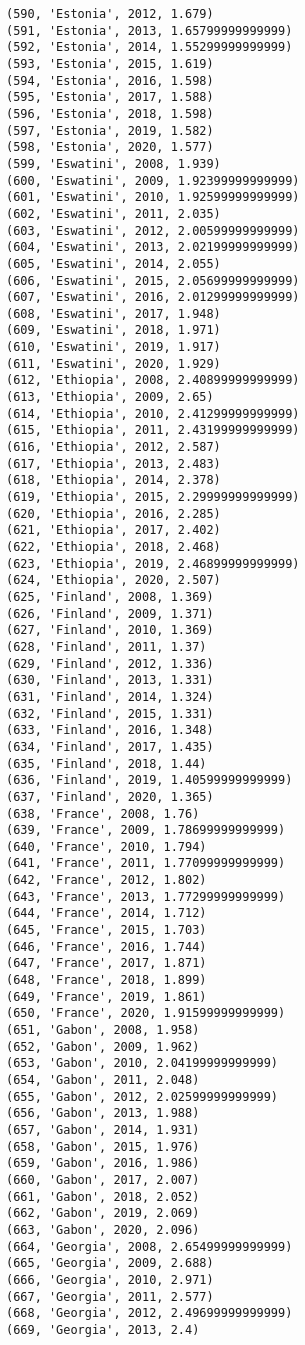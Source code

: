 \documentclass[11pt]{article}
\begin{document}
\begin{Verbatim}[commandchars=\\\{\}]
(590, 'Estonia', 2012, 1.679)
(591, 'Estonia', 2013, 1.65799999999999)
(592, 'Estonia', 2014, 1.55299999999999)
(593, 'Estonia', 2015, 1.619)
(594, 'Estonia', 2016, 1.598)
(595, 'Estonia', 2017, 1.588)
(596, 'Estonia', 2018, 1.598)
(597, 'Estonia', 2019, 1.582)
(598, 'Estonia', 2020, 1.577)
(599, 'Eswatini', 2008, 1.939)
(600, 'Eswatini', 2009, 1.92399999999999)
(601, 'Eswatini', 2010, 1.92599999999999)
(602, 'Eswatini', 2011, 2.035)
(603, 'Eswatini', 2012, 2.00599999999999)
(604, 'Eswatini', 2013, 2.02199999999999)
(605, 'Eswatini', 2014, 2.055)
(606, 'Eswatini', 2015, 2.05699999999999)
(607, 'Eswatini', 2016, 2.01299999999999)
(608, 'Eswatini', 2017, 1.948)
(609, 'Eswatini', 2018, 1.971)
(610, 'Eswatini', 2019, 1.917)
(611, 'Eswatini', 2020, 1.929)
(612, 'Ethiopia', 2008, 2.40899999999999)
(613, 'Ethiopia', 2009, 2.65)
(614, 'Ethiopia', 2010, 2.41299999999999)
(615, 'Ethiopia', 2011, 2.43199999999999)
(616, 'Ethiopia', 2012, 2.587)
(617, 'Ethiopia', 2013, 2.483)
(618, 'Ethiopia', 2014, 2.378)
(619, 'Ethiopia', 2015, 2.29999999999999)
(620, 'Ethiopia', 2016, 2.285)
(621, 'Ethiopia', 2017, 2.402)
(622, 'Ethiopia', 2018, 2.468)
(623, 'Ethiopia', 2019, 2.46899999999999)
(624, 'Ethiopia', 2020, 2.507)
(625, 'Finland', 2008, 1.369)
(626, 'Finland', 2009, 1.371)
(627, 'Finland', 2010, 1.369)
(628, 'Finland', 2011, 1.37)
(629, 'Finland', 2012, 1.336)
(630, 'Finland', 2013, 1.331)
(631, 'Finland', 2014, 1.324)
(632, 'Finland', 2015, 1.331)
(633, 'Finland', 2016, 1.348)
(634, 'Finland', 2017, 1.435)
(635, 'Finland', 2018, 1.44)
(636, 'Finland', 2019, 1.40599999999999)
(637, 'Finland', 2020, 1.365)
(638, 'France', 2008, 1.76)
(639, 'France', 2009, 1.78699999999999)
(640, 'France', 2010, 1.794)
(641, 'France', 2011, 1.77099999999999)
(642, 'France', 2012, 1.802)
(643, 'France', 2013, 1.77299999999999)
(644, 'France', 2014, 1.712)
(645, 'France', 2015, 1.703)
(646, 'France', 2016, 1.744)
(647, 'France', 2017, 1.871)
(648, 'France', 2018, 1.899)
(649, 'France', 2019, 1.861)
(650, 'France', 2020, 1.91599999999999)
(651, 'Gabon', 2008, 1.958)
(652, 'Gabon', 2009, 1.962)
(653, 'Gabon', 2010, 2.04199999999999)
(654, 'Gabon', 2011, 2.048)
(655, 'Gabon', 2012, 2.02599999999999)
(656, 'Gabon', 2013, 1.988)
(657, 'Gabon', 2014, 1.931)
(658, 'Gabon', 2015, 1.976)
(659, 'Gabon', 2016, 1.986)
(660, 'Gabon', 2017, 2.007)
(661, 'Gabon', 2018, 2.052)
(662, 'Gabon', 2019, 2.069)
(663, 'Gabon', 2020, 2.096)
(664, 'Georgia', 2008, 2.65499999999999)
(665, 'Georgia', 2009, 2.688)
(666, 'Georgia', 2010, 2.971)
(667, 'Georgia', 2011, 2.577)
(668, 'Georgia', 2012, 2.49699999999999)
(669, 'Georgia', 2013, 2.4)

\end{Verbatim}
\end{document}
